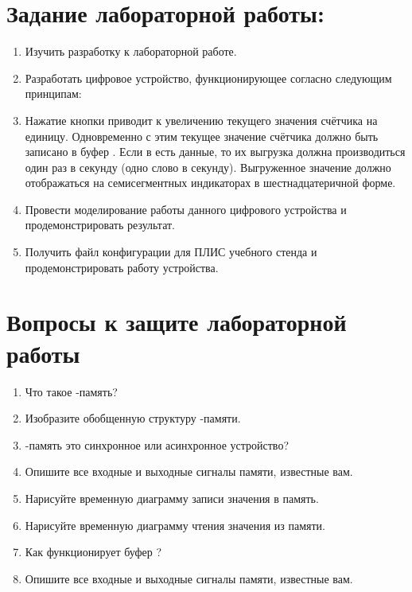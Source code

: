

\section{Задание лабораторной работы:}

\begin{enumerate}[noitemsep,topsep=0pt, after=\vspace{2pt}]

	\item{Изучить разработку к лабораторной работе.}
	\item{Разработать цифровое устройство, функционирующее согласно следующим принципам:}
	\item{Нажатие кнопки приводит к увеличению текущего значения счётчика на единицу. Одновременно с этим текущее значение счётчика должно быть записано в буфер . Если в  есть данные, то их выгрузка должна производиться один раз в секунду (одно слово в секунду). Выгруженное значение должно отображаться на семисегментных индикаторах в шестнадцатеричной форме.}
	\item{Провести моделирование работы данного цифрового устройства и продемонстрировать результат.}
	\item{Получить файл конфигурации для ПЛИС учебного стенда и продемонстрировать работу устройства.}

\end{enumerate}


\section{Вопросы к защите лабораторной работы}


\begin{enumerate}[noitemsep,topsep=0pt, after=\vspace{2pt}]

	\item{Что такое -память?}
	\item{Изобразите обобщенную структуру -памяти.}
	\item{-память это синхронное или асинхронное устройство?}
	\item{Опишите все входные и выходные сигналы  памяти, известные вам.}
	\item{Нарисуйте временную диаграмму записи значения в  память.}
	\item{Нарисуйте временную диаграмму чтения значения из  памяти.}
	\item{Как функционирует буфер ?}
	\item{Опишите все входные и выходные сигналы  памяти, известные вам.}

\end{enumerate}